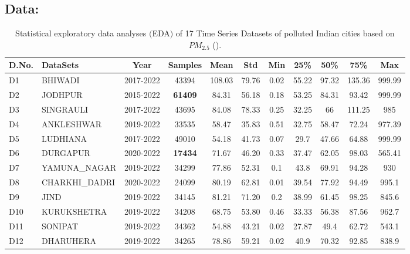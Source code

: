 \documentclass[a4paper, fleqn]{cas-sc}
\theoremstyle{definition}
\theoremstyle{remark}
\begin{document}
\subsection{Data: }

\begin{table}[h!]
  \caption{Statistical exploratory data analyses $($EDA$)$ of 17 Time Series Datasets of polluted Indian cities based on $PM_{2.5}$ (\cite{bhawan2020central}).}
  \label{Eda1}
  
  \begin{tabular}{llccccccccc}
  \hline
  
  D.No. & DataSets & Year  & Samples &Mean &Std & Min &25\% &50\% &75\% & Max\\ \hline
  
 D1 &  BHIWADI          & 2017-2022  & 43394   & 108.03 & 79.76  & 0.02 & 55.22   & 97.32       & 135.36 & 999.99 \\ 
 D2 &  JODHPUR     & 2015-2022 &\textbf{61409} & 84.31 & 56.18 & 0.18 & 53.25   & 84.31 & 93.42   & 999.99 \\
 D3 &  SINGRAULI    & 2017-2022 & 43695   & 84.08 & 78.33 & 0.25 & 32.25   & 66          & 111.25  & 985    \\
 D4 &  ANKLESHWAR   & 2019-2022  & 33535     & 58.47 & 35.83 & 0.51 & 32.75   & 58.47 & 72.24   & 977.39 \\ 
 D5 &  LUDHIANA        & 2017-2022  & 49010  & 54.18 & 41.73 & 0.07 & 29.7    & 47.66       & 64.88   & 999.99 \\
 D6 &  DURGAPUR       & 2020-2022 & \textbf{17434}   & 71.67 & 46.20 & 0.33 & 37.47 & 62.05      & 98.03 & 565.41 \\ 
 D7 &  YAMUNA\_NAGAR  & 2019-2022 & 34299   & 77.86  & 52.31 & 0.1  & 43.8    & 69.91       & 94.28   & 930    \\
 D8 &  CHARKHI\_DADRI  & 2020-2022  & 24099   & 80.19 & 62.81 & 0.01 & 39.54  & 77.92       & 94.49  & 995.1  \\ 
 D9 &  JIND             & 2019-2022 & 34145 & 81.21 & 71.20 & 0.2  & 38.99   & 61.45       & 98.25   & 845.6  \\ 
 D10 &  KURUKSHETRA    & 2019-2022  & 34208 & 68.75& 53.80 & 0.46 & 33.33   & 56.38       & 87.56   & 962.7  \\ 
 D11 &  SONIPAT        & 2019-2022  & 34362  & 54.88 & 43.21  & 0.02 & 27.87   & 49.4        & 62.72   & 543.1  \\ 
 D12 &  DHARUHERA     & 2019-2022 & 34265 & 78.86 & 59.21 & 0.02 & 40.9    & 70.32       & 92.85   & 838.9  \\

\end{tabular}
\end{table}
\end{document}
